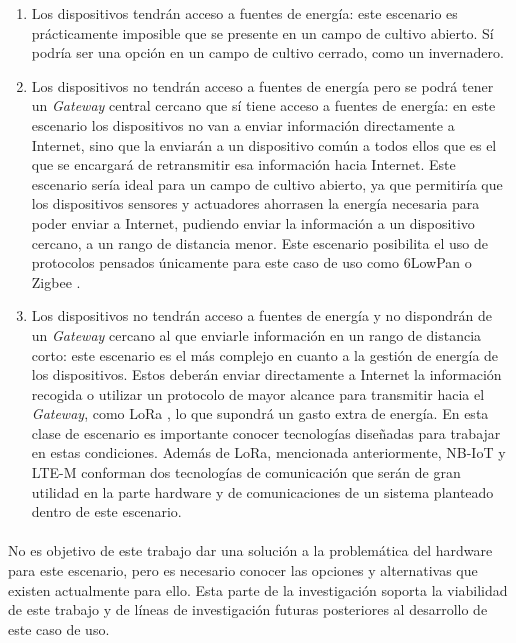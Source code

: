 \documentclass[../../memoria.tex]{subfiles}
\begin{document}
\begin{enumerate}
    \item Los dispositivos tendrán acceso a fuentes de energía: este escenario es prácticamente imposible que se presente en un campo de cultivo abierto. Sí podría ser una opción en un campo de cultivo cerrado, como un invernadero.

    \item Los dispositivos no tendrán acceso a fuentes de energía pero se podrá tener un \textit{Gateway} central cercano que sí tiene acceso a fuentes de energía: en este escenario los dispositivos no van a enviar información directamente a Internet, sino que la enviarán a un dispositivo común a todos ellos que es el que se encargará de retransmitir esa información hacia Internet. Este escenario sería ideal para un campo de cultivo abierto, ya que permitiría que los dispositivos sensores y actuadores ahorrasen la energía necesaria para poder enviar a Internet, pudiendo enviar la información a un dispositivo cercano, a un rango de distancia menor. Este escenario posibilita el uso de protocolos pensados únicamente para este caso de uso como 6LowPan \cite{6lowpan} o Zigbee \cite{zigbee}.

    \item Los dispositivos no tendrán acceso a fuentes de energía y no dispondrán de un \textit{Gateway} cercano al que enviarle información en un rango de distancia corto: este escenario es el más complejo en cuanto a la gestión de energía de los dispositivos. Estos deberán enviar directamente a Internet la información recogida o utilizar un protocolo de mayor alcance para transmitir hacia el \textit{Gateway}, como LoRa \cite{lora}, lo que supondrá un gasto extra de energía. En esta clase de escenario es importante conocer tecnologías diseñadas para trabajar en estas condiciones. Además de LoRa, mencionada anteriormente, NB-IoT \cite{nbiot} y LTE-M \cite{ltem} conforman dos tecnologías de comunicación que serán de gran utilidad en la parte hardware y de comunicaciones de un sistema planteado dentro de este escenario.
\end{enumerate}

\paragraph{}
No es objetivo de este trabajo dar una solución a la problemática del hardware para este escenario, pero es necesario conocer las opciones y alternativas que existen actualmente para ello. Esta parte de la investigación soporta la viabilidad de este trabajo y de líneas de investigación futuras posteriores al desarrollo de este caso de uso.
\end{document}
